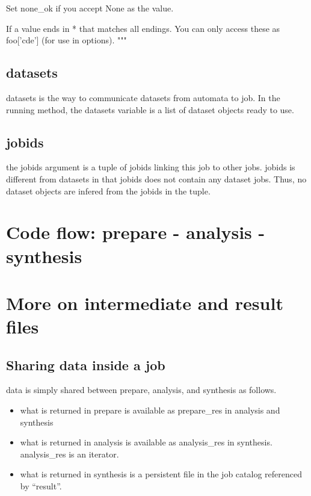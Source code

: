 \begin{python}
    Set none_ok if you accept None as the value.                                                                                                                                                                                  
                                                                                                                                                                                                                                  
    If a value ends in * that matches all endings. You can only access                                                                                                                                                            
    these as foo['cde'] (for use in options{}).                                                                                                                                                                                   
    """
\end{python}

\subsection{datasets}
datasets is the way to communicate datasets from automata to job.  In
the running method, the datasets variable is a list of dataset objects
ready to use.

\subsection{jobids}
the jobids argument is a tuple of jobids linking this job to other
jobs.  jobids is different from datasets in that jobids does not
contain any dataset jobs.  Thus, no dataset objects are infered from
the jobids in the tuple.



\section{Code flow:  prepare - analysis - synthesis}

\section{More on intermediate and result files}

\subsection{Sharing data inside a job}
data is simply shared between prepare, analysis, and synthesis as follows.
\begin{itemize}
\item what is returned in prepare is available as prepare\_res in analysis and synthesis
\item what is returned in analysis is available as analysis\_res in synthesis.  analysis\_res is an iterator.
\item what is returned in synthesis is a persistent file in the job catalog referenced by ``result''.
\end{itemize}

